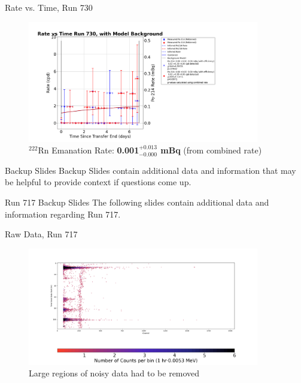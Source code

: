 \documentclass[aspectratio=169]{beamer}
\begin{document}
\begin{frame}{Rate vs. Time, Run 730}
\label{RvT_730}
    \begin{figure}
        \begin{center}
            \includegraphics[width=0.9\textwidth]
            {assets/730/RvT.png}
            \caption{$^{222}$Rn Emanation Rate: 
            \textbf{0.001$^{+0.013}_{-0.000}$ mBq} (from combined rate)}
        \end{center}
    \end{figure}    
\end{frame}

\begin{frame}{Backup Slides}
    Backup Slides contain additional data and information that may be helpful
    to provide context if questions come up.
\end{frame}

\begin{frame}{Run 717 Backup Slides}
\label{717_Backup}
    The following slides contain additional data and information regarding Run 717.
\end{frame}

\begin{frame}{Raw Data, Run 717}
    \begin{figure}
        \begin{center}
            \includegraphics[width=0.9\textwidth]
            {assets/717/RD.png}
            \caption{Large regions of noisy data had to be removed}
        \end{center}
    \end{figure}
\end{frame}
\end{document}
